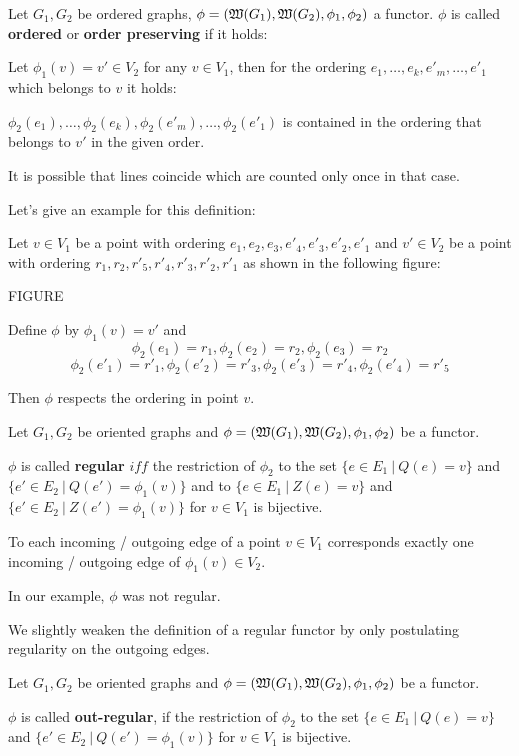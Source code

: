 \begin{definition}
Let $G_1, G_2$ be ordered graphs, $\phi = (\mbox{$\mathfrak{W}(G_1)$}, \mbox{$\mathfrak{W}(G_2)$},
\phi_1, \phi_2)$ a functor. $\phi$ is called {\bf ordered} or {\bf order
preserving} if it holds:

Let $\phi_1(v) = v' \in V_2$ for any $v \in V_1$, then for the ordering $e_1,
\ldots, e_k, e'_m, \ldots, e'_1$ which belongs to $v$ it holds:

$\phi_2(e_1), \ldots, \phi_2(e_k), \phi_2(e'_m), \ldots, \phi_2(e'_1)$ is
contained in the ordering that belongs to $v'$ in the given order. 
\end{definition}

It is possible that lines coincide which are counted only once in that case.

Let's give an example for this definition:

Let $v \in V_1$ be a point with ordering $e_1, e_2, e_3, e'_4, e'_3, e'_2,
e'_1$ and $v' \in V_2$ be a point with ordering $r_1, r_2, r'_5,
r'_4, r'_3, r'_2, r'_1$ as shown in the following figure:

FIGURE

Define $\phi$ by $\phi_1(v) = v'$ and 
\[ \phi_2(e_1) = r_1, \phi_2(e_2) = r_2, \phi_2(e_3) = r_2 \]
\[ \phi_2(e'_1) = r'_1, \phi_2(e'_2) = r'_3, \phi_2(e'_3) = r'_4, \phi_2(e'_4) = r'_5 \]

Then $\phi$ respects the ordering in point $v$.

\begin{definition}
Let $G_1, G_2$ be oriented graphs and $\phi = (\mbox{$\mathfrak{W}(G_1)$}, \mbox{$\mathfrak{W}(G_2)$},
\phi_1, \phi_2)$ be a functor.

$\phi$ is called {\bf regular} $iff$ the restriction of $\phi_2$
to the set $\{ e \in E_1\ |\ Q(e) = v \}$ and $\{ e' \in E_2\ |\ Q(e') =
\phi_1(v) \}$ and to $\{ e \in E_1\ |\ Z(e) = v \}$ and $\{ e' \in E_2\ |\ Z(e')
= \phi_1(v) \}$ for $v \in V_1$ is bijective.
\end{definition}

To each incoming / outgoing edge of a point $v \in V_1$ corresponds exactly
one incoming / outgoing edge of $\phi_1(v) \in V_2$.

In our example, $\phi$ was not regular.

We slightly weaken the definition of a regular functor by only postulating
regularity on the outgoing edges.

\begin{definition}
Let $G_1, G_2$ be oriented graphs and $\phi = (\mbox{$\mathfrak{W}(G_1)$}, \mbox{$\mathfrak{W}(G_2)$},
\phi_1, \phi_2)$ be a functor.

$\phi$ is called {\bf out-regular}, if the restriction of $\phi_2$
to the set $\{ e \in E_1\ |\ Q(e) = v \}$ and $\{ e' \in E_2\ |\ Q(e') =
\phi_1(v) \}$ for $v \in V_1$ is bijective.
\end{definition}


